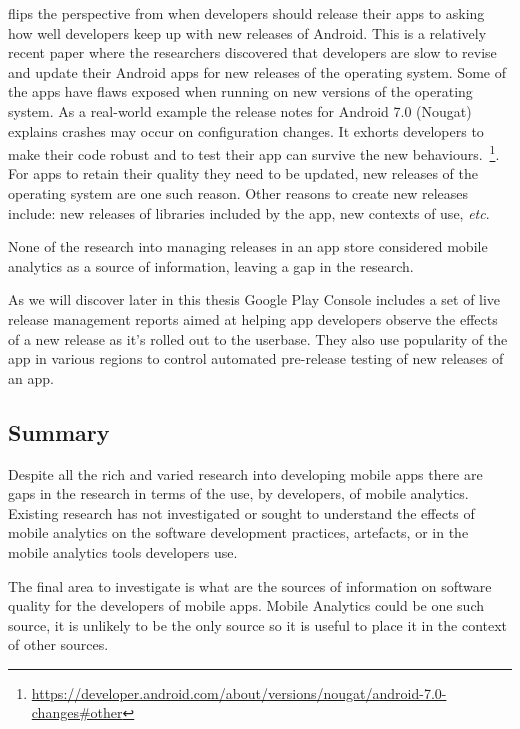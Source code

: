  flips the perspective from when developers should release their apps to asking how well developers keep up with new releases of Android. This is a relatively recent paper where the researchers discovered that developers are slow to revise and update their Android apps for new releases of the operating system. Some of the apps have flaws exposed when running on new versions of the operating system. As a real-world example the release notes for Android 7.0 (Nougat) explains crashes may occur on configuration changes. It exhorts developers to make their code robust and to test their app can survive the new behaviours.~\footnote{\url{https://developer.android.com/about/versions/nougat/android-7.0-changes\#other}}.
For apps to retain their quality they need to be updated, new releases of the operating system are one such reason. Other reasons to create new releases include: new releases of libraries included by the app, new contexts of use, \emph{etc}.

None of the research into managing releases in an app store considered mobile analytics as a source of information, leaving a gap in the research.

As we will discover later in this thesis Google Play Console includes a set of live release management reports aimed at helping app developers observe the effects of a new release as it's rolled out to the userbase. They also use popularity of the app in various regions to control automated pre-release testing of new releases of an app.%

\subsection{Summary} 
Despite all the rich and varied research into developing mobile apps there are gaps in the research in terms of the use, by developers, of mobile analytics. Existing research has not investigated or sought to understand the effects of mobile analytics on the software development practices, artefacts, or in the mobile analytics tools developers use. 

The final area to investigate is what are the sources of information on software quality for the developers of mobile apps. Mobile Analytics could be one such source, it is unlikely to be the only source so it is useful to place it in the context of other sources.


